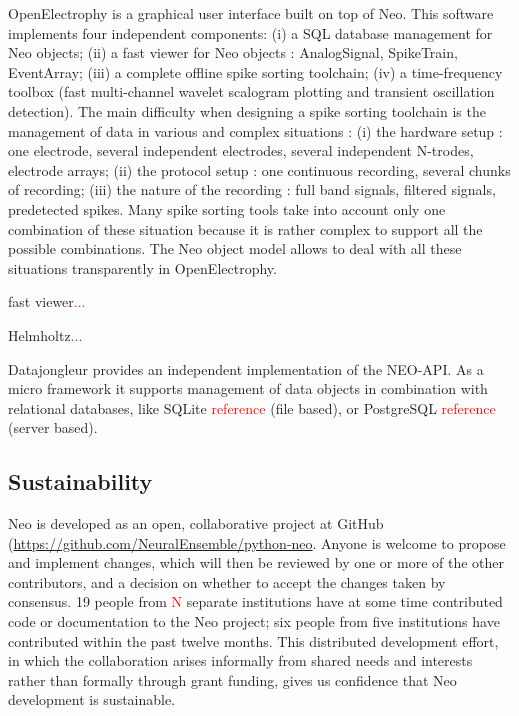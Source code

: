 \documentclass{frontiers}
\newcommand{\missing}[1]{\textcolor{red}{#1}}
\begin{document}
OpenElectrophy \citep{Garcia2009} is a graphical user interface built on top of Neo. This software implements four independent components:
   (i) a SQL database management for Neo objects;
   (ii) a fast viewer for Neo objects : AnalogSignal, SpikeTrain, EventArray;
   (iii) a complete offline spike sorting toolchain;
   (iv) a time-frequency toolbox (fast multi-channel wavelet scalogram plotting and transient oscillation detection).
The main difficulty when designing a spike sorting toolchain is the management of data in various and complex situations : 
   (i) the hardware setup : one electrode, several independent electrodes, several independent N-trodes, electrode arrays;
   (ii) the protocol setup : one continuous recording, several chunks of recording;
   (iii) the nature of the recording : full band signals, filtered signals, predetected spikes.
Many spike sorting tools take into account only one combination of these situation because it is rather complex to support all the possible combinations. The Neo object model allows to deal with all these situations transparently in OpenElectrophy.


fast viewer\missing{...}

Helmholtz\missing{...}

Datajongleur provides an independent implementation of the NEO-API. As a micro
framework it supports management of data objects in combination with relational
databases, like SQLite \missing{reference} (file based), or PostgreSQL
\missing{reference} (server based).


\subsection{Sustainability}

Neo is developed as an open, collaborative project at GitHub (\url{https://github.com/NeuralEnsemble/python-neo}.
Anyone is welcome to propose and implement changes, which will then be reviewed by one or more of the other contributors, and a decision on whether to accept the changes taken by consensus.
19 people from \missing{N} separate institutions have at some time contributed code or documentation to the Neo project;  six people from five institutions have contributed within the past twelve months.
This distributed development effort, in which the collaboration arises informally from shared needs and interests rather than formally through grant funding, gives us confidence that Neo development is sustainable.
\end{document}
